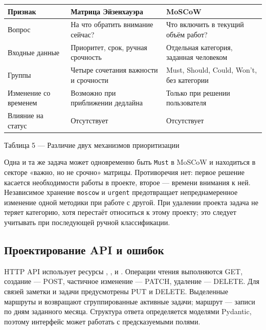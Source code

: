 \documentclass[14pt,a4paper]{extarticle}
\begin{document}
\begingroup\small
\begin{longtable}[]{@{}
  >{\raggedright\arraybackslash}p{}
  >{\raggedright\arraybackslash}p{}
  >{\raggedright\arraybackslash}p{}@{}}
\toprule\noalign{}
\begin{minipage}[b]{\linewidth}\raggedright
\textbf{Признак}
\end{minipage} & \begin{minipage}[b]{\linewidth}\raggedright
\textbf{Матрица Эйзенхауэра}
\end{minipage} & \begin{minipage}[b]{\linewidth}\raggedright
\textbf{MoSCoW}
\end{minipage} \\
\midrule\noalign{}
\endhead
\bottomrule\noalign{}
\endlastfoot
Вопрос & На что обратить внимание сейчас? & Что включить в текущий объём работ? \\
Входные данные & Приоритет, срок, ручная срочность & Отдельная категория, заданная человеком \\
Группы & Четыре сочетания важности и срочности & Must, Should, Could, Won't, без категории \\
Изменение со временем & Возможно при приближении дедлайна & Только при решении пользователя \\
Влияние на статус & Отсутствует & Отсутствует \\
\end{longtable}
\endgroup

Таблица 5 --- Различие двух механизмов приоритизации

Одна и та же задача может одновременно быть \texttt{Must} в MoSCoW и находиться в секторе «важно, но не срочно» матрицы. Противоречия нет: первое решение касается необходимости работы в проекте, второе --- времени внимания к ней. Независимое хранение \texttt{moscow} и \texttt{urgent} предотвращает непреднамеренное изменение одной методики при работе с другой. При удалении проекта задача не теряет категорию, хотя перестаёт относиться к этому проекту; это следует учитывать при последующей ручной классификации.

\subsection{Проектирование API и ошибок}

HTTP API использует ресурсы , ,  и . Операции чтения выполняются GET, создание --- POST, частичное изменение --- PATCH, удаление --- DELETE. Для связей заметки и задачи предусмотрены PUT и DELETE. Выделенные маршруты  и  возвращают сгруппированные активные задачи; маршрут  --- записи по дням заданного месяца. Структура ответа определяется моделями Pydantic, поэтому интерфейс может работать с предсказуемыми полями.
\end{document}
